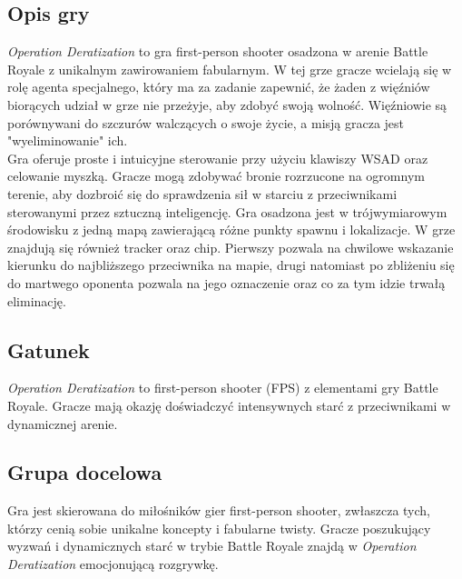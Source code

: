\subsection{Opis gry} \label{game_description}
\textit{Operation Deratization} to gra first-person shooter osadzona w arenie Battle Royale z unikalnym zawirowaniem fabularnym. W tej grze gracze wcielają się w rolę agenta specjalnego, który ma za zadanie zapewnić, że żaden z więźniów biorących udział w grze nie przeżyje, aby zdobyć swoją wolność. Więźniowie są porównywani do szczurów walczących o swoje życie, a misją gracza jest "wyeliminowanie" ich. \\
Gra oferuje proste i intuicyjne sterowanie przy użyciu klawiszy WSAD oraz celowanie myszką. Gracze mogą zdobywać bronie rozrzucone na ogromnym terenie, aby dozbroić się do sprawdzenia sił w starciu z przeciwnikami sterowanymi przez sztuczną inteligencję. Gra osadzona jest w trójwymiarowym środowisku z jedną mapą zawierającą różne punkty spawnu i lokalizacje. W grze znajdują się również tracker oraz chip. Pierwszy pozwala na chwilowe wskazanie kierunku do najbliższego przeciwnika na mapie, drugi natomiast po zbliżeniu się do martwego oponenta pozwala na jego oznaczenie oraz co za tym idzie trwałą eliminację.

\subsection{Gatunek}
\textit{Operation Deratization} to first-person shooter (FPS) z elementami gry Battle Royale. Gracze mają okazję doświadczyć intensywnych starć z przeciwnikami w dynamicznej arenie.

\subsection{Grupa docelowa}
Gra jest skierowana do miłośników gier first-person shooter, zwłaszcza tych, którzy cenią sobie unikalne koncepty i fabularne twisty. Gracze poszukujący wyzwań i dynamicznych starć w trybie Battle Royale znajdą w \textit{Operation Deratization} emocjonującą rozgrywkę.

